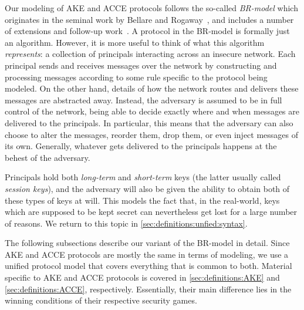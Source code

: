 Our modeling of AKE and ACCE protocols follows the so-called \emph{BR-model} which originates in the seminal work by Bellare and Rogaway~\cite{C:BelRog93},
and includes a number of extensions and follow-up work~\cite{STOC:BelRog95,Blake-WilsonM:1997:BR93_asymmetric,EC:BelPoiRog00,EC:CanKra01}.
A protocol in the BR-model is formally just an algorithm.
However,
it is more useful to think of what this algorithm \emph{represents}:
a collection of principals interacting across an insecure network.
Each principal sends and receives messages over the network by constructing and processing messages according to some rule specific to the protocol being modeled.
On the other hand, 
details of how the network routes and delivers these messages are abstracted away.
Instead,
the adversary is assumed to be in full control of the network,
being able to decide exactly where and when messages are delivered to the principals.
In particular,
this means that the adversary can also choose to alter the messages,
reorder them,
drop them,
or even inject messages of its own.
Generally,
whatever gets delivered to the principals happens at the behest of the adversary. 

Principals hold both \emph{long-term} and \emph{short-term}  keys (the latter usually called \emph{session keys}),
and the adversary will also be given the ability to obtain both of these types of keys at will.
This models the fact that, in the real-world,
keys which are supposed to be kept secret can nevertheless get lost for a large number of reasons.
We return to this topic in \cref{sec:definitions:unfied:syntax}.

The following subsections describe our variant of the BR-model in detail.
Since AKE and ACCE protocols are mostly the same in terms of modeling,
we use a unified protocol model that covers everything that is common to both.
Material specific to AKE and ACCE protocols is covered in \cref{sec:definitions:AKE} and \cref{sec:definitions:ACCE},
respectively.
Essentially,
their main difference lies in the winning conditions of their respective security games.
 



